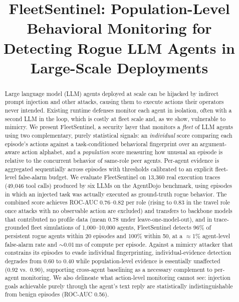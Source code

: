 \documentclass[conference]{IEEEtran}
\newcommand{\sys}{FleetSentinel}
\begin{document}
\title{\sys{}: Population-Level Behavioral Monitoring for Detecting Rogue LLM Agents in Large-Scale Deployments}

\author{
\and
{}
\and
{}
}

\maketitle

\begin{abstract}
Large language model (LLM) agents deployed at scale can be hijacked by indirect prompt injection and other attacks, causing them to execute actions their operators never intended. Existing runtime defenses monitor each agent in isolation, often with a second LLM in the loop, which is costly at fleet scale and, as we show, vulnerable to mimicry. We present \sys{}, a security layer that monitors a \emph{fleet} of LLM agents using two complementary, purely statistical signals: an \emph{individual} score comparing each episode's actions against a task-conditioned behavioral fingerprint over an argument-aware action alphabet, and a \emph{population} score measuring how unusual an episode is relative to the concurrent behavior of same-role peer agents. Per-agent evidence is aggregated sequentially across episodes with thresholds calibrated to an explicit fleet-level false-alarm budget. We evaluate \sys{} on 13{,}360 real execution traces (49{,}046 tool calls) produced by six LLMs on the AgentDojo benchmark, using episodes in which an injected task was actually executed as ground-truth rogue behavior. The combined score achieves ROC-AUC 0.76--0.82 per role (rising to 0.83 in the travel role once attacks with no observable action are excluded) and transfers to backbone models that contributed no profile data (mean 0.78 under leave-one-model-out), and in trace-grounded fleet simulations of 1{,}000--10{,}000 agents, \sys{} detects 96\% of persistent rogue agents within 20 episodes and 100\% within 50, at a $\approx$1\% agent-level false-alarm rate and $\sim$0.01\,ms of compute per episode. Against a mimicry attacker that constrains its episodes to evade individual fingerprinting, individual-evidence detection degrades from 0.60 to 0.40 while population-level evidence is essentially unaffected (0.92 vs.\ 0.90), supporting cross-agent baselining as a necessary complement to per-agent monitoring. We also delineate what action-level monitoring cannot see: injection goals achievable purely through the agent's text reply are statistically indistinguishable from benign episodes (ROC-AUC 0.56).
\end{abstract}
\end{document}
